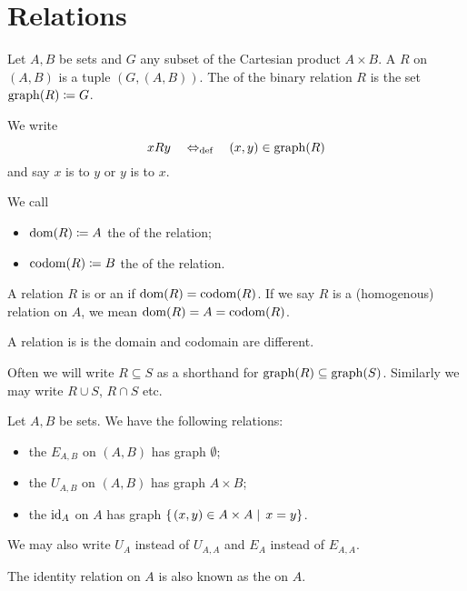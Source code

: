 \section{Relations}
\begin{definition}
Let $A,B$ be sets and $G$ any subset of the Cartesian product $A\times B$. A  $R$ on $(A, B)$ is a tuple $(G,(A,B))$. The  of the binary relation $R$ is the set $\operatorname{graph}(R) \coloneqq G$.

We write
\[ xRy \quad\Leftrightarrow_{\text{def}}\quad  (x,y)\in \operatorname{graph}(R) \]
and say $x$ is  to $y$ or $y$ is  to $x$.

We call
\begin{itemize}
\item $\operatorname{dom}(R) \coloneqq A$ the  of the relation;
\item $\operatorname{codom}(R) \coloneqq B$ the  of the relation.
\end{itemize}
A relation $R$ is  or an  if $\operatorname{dom}(R) = \operatorname{codom}(R)$.
If we say $R$ is a (homogenous) relation on $A$, we mean $\operatorname{dom}(R) = A = \operatorname{codom}(R)$. 

A relation is  is the domain and codomain are different.
\end{definition}

Often we will write $R \subseteq S$ as a shorthand for $\operatorname{graph}(R)\subseteq \operatorname{graph}(S)$. Similarly we may write $R\cup S$, $R\cap S$ etc.



\begin{definition}
Let $A,B$ be sets. We have the following relations:
\begin{itemize}
\item the  $E_{A,B}$ on $(A, B)$ has graph $\emptyset$;
\item the  $U_{A,B}$ on $(A, B)$ has graph $A\times B$;
\item the  $\operatorname{id}_A$ on $A$ has graph $\left\{\left. (x,y)\in A\times A \;\right|\; x=y \right\}$.
\end{itemize}
We may also write $U_A$ instead of $U_{A,A}$ and $E_A$ instead of $E_{A,A}$.
\end{definition}
The identity relation on $A$ is also known as the  on $A$.

